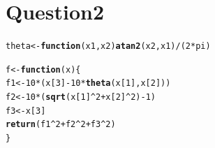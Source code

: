 \documentclass{article}\usepackage[]{graphicx}\usepackage[]{color}
\makeatletter
\newcommand{\hlnum}[1]{\textcolor[rgb]{0.686,0.059,0.569}{#1}}%
\newcommand{\hlopt}[1]{\textcolor[rgb]{0,0,0}{#1}}%
\newcommand{\hlstd}[1]{\textcolor[rgb]{0.345,0.345,0.345}{#1}}%
\newcommand{\hlkwa}[1]{\textcolor[rgb]{0.161,0.373,0.58}{\textbf{#1}}}%
\newcommand{\hlkwb}[1]{\textcolor[rgb]{0.69,0.353,0.396}{#1}}%
\newcommand{\hlkwc}[1]{\textcolor[rgb]{0.333,0.667,0.333}{#1}}%
\newcommand{\hlkwd}[1]{\textcolor[rgb]{0.737,0.353,0.396}{\textbf{#1}}}%
\newenvironment{kframe}{%
 \def\at@end@of@kframe{}%
 \ifinner\ifhmode%
  \def\at@end@of@kframe{\end{minipage}}%
  \begin{minipage}{\columnwidth}%
 \fi\fi%
 \def\FrameCommand##1{\hskip\@totalleftmargin \hskip-\fboxsep
 \colorbox{shadecolor}{##1}\hskip-\fboxsep
     \hskip-\linewidth \hskip-\@totalleftmargin \hskip\columnwidth}%
 \MakeFramed {\advance\hsize-\width
   \@totalleftmargin\z@ \linewidth\hsize
   \@setminipage}}%
 {\par\unskip\endMakeFramed%
 \at@end@of@kframe}
\newenvironment{knitrout}{}{} %
\makeatother
\begin{document}
\section{Question2}
\begin{knitrout}
\color{fgcolor}\begin{kframe}
\begin{alltt}
\hlstd{theta} \hlkwb{<-} \hlkwa{function}\hlstd{(}\hlkwc{x1}\hlstd{,}\hlkwc{x2}\hlstd{)} \hlkwd{atan2}\hlstd{(x2, x1)}\hlopt{/}\hlstd{(}\hlnum{2}\hlopt{*}\hlstd{pi)}

\hlstd{f} \hlkwb{<-} \hlkwa{function}\hlstd{(}\hlkwc{x}\hlstd{) \{}
  \hlstd{f1} \hlkwb{<-} \hlnum{10}\hlopt{*}\hlstd{(x[}\hlnum{3}\hlstd{]} \hlopt{-} \hlnum{10}\hlopt{*}\hlkwd{theta}\hlstd{(x[}\hlnum{1}\hlstd{],x[}\hlnum{2}\hlstd{]))}
  \hlstd{f2} \hlkwb{<-} \hlnum{10}\hlopt{*}\hlstd{(}\hlkwd{sqrt}\hlstd{(x[}\hlnum{1}\hlstd{]}\hlopt{^}\hlnum{2} \hlopt{+} \hlstd{x[}\hlnum{2}\hlstd{]}\hlopt{^}\hlnum{2}\hlstd{)} \hlopt{-} \hlnum{1}\hlstd{)}
  \hlstd{f3} \hlkwb{<-} \hlstd{x[}\hlnum{3}\hlstd{]}
  \hlkwd{return}\hlstd{(f1}\hlopt{^}\hlnum{2} \hlopt{+} \hlstd{f2}\hlopt{^}\hlnum{2} \hlopt{+} \hlstd{f3}\hlopt{^}\hlnum{2}\hlstd{)}
\hlstd{\}}
\end{alltt}
\end{kframe}
\end{knitrout}
\end{document}
